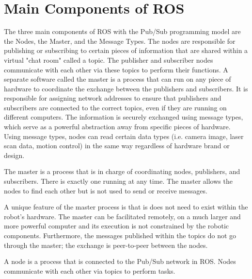 \documentclass[twoside]{article}
\begin{document}
\section{Main Components of ROS}
The three main components of ROS with the Pub/Sub programming model are the Nodes, the Master, and the Message Types. The nodes are responsible for publishing or subscribing to certain pieces of information that are shared within a virtual "chat room" called a topic. The publisher and subscriber nodes communicate with each other via these topics to perform their functions. A separate software called the master is a process that can run on any piece of hardware to coordinate the exchange between the publishers and subscribers. It is responsible for assigning network addresses to ensure that publishers and subscribers are connected to the correct topics, even if they are running on different computers. The information is securely exchanged using message types, which serve as a powerful abstraction away from specific pieces of hardware. Using message types, nodes can read certain data types (i.e. camera image, laser scan data, motion control) in the same way regardless of hardware brand or design.

\begin{frm-def}[Master]
The master is a process that is in charge of coordinating nodes, publishers, and subscribers. There is exactly one running at any time. The master allows the nodes to find each other but is not used to send or receive messages.
\end{frm-def}

A unique feature of the master process is that is does not need to exist within the robot's hardware. The master can be facilitated remotely, on a much larger and more powerful computer and its execution is not constrained by the robotic components. Furthermore, the messages published within the topics do not go through the master; the exchange is peer-to-peer between the nodes.\\ %

\begin{frm-def}[Node]
A node is a process that is connected to the Pub/Sub network in ROS. Nodes communicate with each other via topics to perform tasks.
\end{frm-def}
\end{document}
